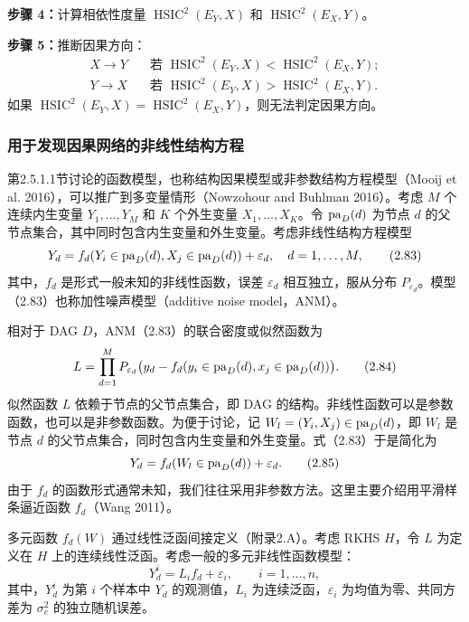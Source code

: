 \noindent\textbf{步骤 4：}计算相依性度量 $\operatorname{HSIC}^2(E_Y,X)$ 和 $\operatorname{HSIC}^2(E_X,Y)$。

\noindent\textbf{步骤 5：}推断因果方向：
\[
\begin{aligned}
X\to Y&\quad\text{若 }\operatorname{HSIC}^2(E_Y,X)<\operatorname{HSIC}^2(E_X,Y);\\
Y\to X&\quad\text{若 }\operatorname{HSIC}^2(E_Y,X)>\operatorname{HSIC}^2(E_X,Y).
\end{aligned}
\]
如果 $\operatorname{HSIC}^2(E_Y,X)=\operatorname{HSIC}^2(E_X,Y)$，则无法判定因果方向。

\subsubsection{用于发现因果网络的非线性结构方程}

第2.5.1.1节讨论的函数模型，也称结构因果模型或非参数结构方程模型（Mooij et al. 2016），可以推广到多变量情形（Nowzohour and Buhlman 2016）。考虑 $M$ 个连续内生变量 $Y_1,\ldots,Y_M$ 和 $K$ 个外生变量 $X_1,\ldots,X_K$。令 $\mathrm{pa}_D(d)$ 为节点 $d$ 的父节点集合，其中同时包含内生变量和外生变量。考虑非线性结构方程模型
\begin{equation}
Y_d=f_d(Y_i\in\mathrm{pa}_D(d),X_j\in\mathrm{pa}_D(d))+\varepsilon_d,
\quad d=1,\ldots,M,
\tag{2.83}
\end{equation}
其中，$f_d$ 是形式一般未知的非线性函数，误差 $\varepsilon_d$ 相互独立，服从分布 $P_{\varepsilon_d}$。模型（2.83）也称加性噪声模型（additive noise model，ANM）。

相对于 DAG $D$，ANM（2.83）的联合密度或似然函数为
\begin{equation}
L=\prod_{d=1}^{M}
P_{\varepsilon_d}\bigl(y_d-f_d(y_i\in\mathrm{pa}_D(d),x_j\in\mathrm{pa}_D(d))\bigr).
\tag{2.84}
\end{equation}
似然函数 $L$ 依赖于节点的父节点集合，即 DAG 的结构。非线性函数可以是参数函数，也可以是非参数函数。为便于讨论，记 $W_l=(Y_i,X_j)\in\mathrm{pa}_D(d)$，即 $W_l$ 是节点 $d$ 的父节点集合，同时包含内生变量和外生变量。式（2.83）于是简化为
\begin{equation}
Y_d=f_d(W_l\in\mathrm{pa}_D(d))+\varepsilon_d.
\tag{2.85}
\end{equation}
由于 $f_d$ 的函数形式通常未知，我们往往采用非参数方法。这里主要介绍用平滑样条逼近函数 $f_d$（Wang 2011）。

多元函数 $f_d(W)$ 通过线性泛函间接定义（附录2.A）。考虑 RKHS $H$，令 $L$ 为定义在 $H$ 上的连续线性泛函。考虑一般的多元非线性函数模型：
\begin{equation}
Y_d^i=L_if_d+\varepsilon_i,\qquad i=1,\ldots,n,
\tag{2.86}
\end{equation}
其中，$Y_d^i$ 为第 $i$ 个样本中 $Y_d$ 的观测值，$L_i$ 为连续泛函，$\varepsilon_i$ 为均值为零、共同方差为 $\sigma_e^2$ 的独立随机误差。

